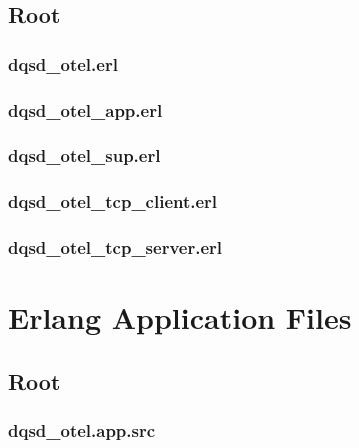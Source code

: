 \subsection*{Root}

\subsubsection*{dqsd\_otel.erl}


\subsubsection*{dqsd\_otel\_app.erl}


\subsubsection*{dqsd\_otel\_sup.erl}


\subsubsection*{dqsd\_otel\_tcp\_client.erl}


\subsubsection*{dqsd\_otel\_tcp\_server.erl}


\section{Erlang Application Files}

\subsection*{Root}

\subsubsection*{dqsd\_otel.app.src}

